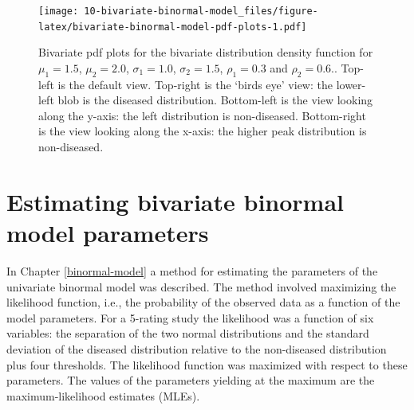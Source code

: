 \documentclass[
]{book}
\begin{document}
\begin{figure}
\centering
\texttt{[image: 10-bivariate-binormal-model\_files/figure-latex/bivariate-binormal-model-pdf-plots-1.pdf]}
\caption{\label{fig:bivariate-binormal-model-pdf-plots}Bivariate pdf plots for the bivariate distribution density function for \(\mu_1 = 1.5\), \(\mu_2 = 2.0\), \(\sigma_1 = 1.0\), \(\sigma_2 = 1.5\), \(\rho_1 = 0.3\) and \(\rho_2 = 0.6\).. Top-left is the default view. Top-right is the `birds eye' view: the lower-left blob is the diseased distribution. Bottom-left is the view looking along the y-axis: the left distribution is non-diseased. Bottom-right is the view looking along the x-axis: the higher peak distribution is non-diseased.}
\end{figure}

\hypertarget{bivariate-binormal-model-multivariate-density-estimation}{%
\section{Estimating bivariate binormal model parameters}\label{bivariate-binormal-model-multivariate-density-estimation}}

In Chapter \ref{binormal-model} a method for estimating the parameters of the univariate binormal model was described. The method involved maximizing the likelihood function, i.e., the probability of the observed data as a function of the model parameters. For a 5-rating study the likelihood was a function of six variables: the separation of the two normal distributions and the standard deviation of the diseased distribution relative to the non-diseased distribution plus four thresholds. The likelihood function was maximized with respect to these parameters. The values of the parameters yielding at the maximum are the maximum-likelihood estimates (MLEs).
\end{document}
